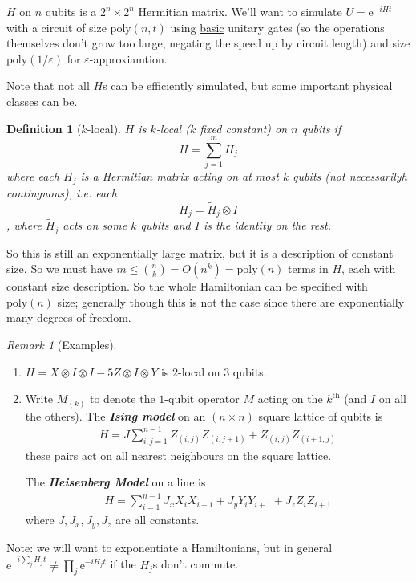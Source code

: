 \documentclass[]{article}
\theoremstyle{custhm}
\theoremstyle{cusdef}
\theoremstyle{custhm}
\theoremstyle{custhm}
\theoremstyle{custhm}
\theoremstyle{custhm}
\theoremstyle{cusdef}
\newtheorem*{defin*}{Definition}
\theoremstyle{remark}
\newtheorem*{remark*}{Remark}
\newcommand{\e}{\mathrm{e}}
\newcommand{\eps}{\varepsilon}
\newcommand{\undf}[1]{\textit{\textbf{#1}}}
\newcommand{\poly}{\textrm{poly}}
\begin{document}
$H$ on $n$ qubits is a $2^n\times 2^n$ Hermitian matrix. We'll want to simulate $U = \e^{-iHt}$ with a circuit of size $\poly(n,t)$ using \underline{basic} unitary gates (so the operations themselves don't grow too large, negating the speed up by circuit length) and size $\poly(1/\eps)$ for $\eps$-approxiamtion.

Note that not all $H$s can be efficiently simulated, but some important physical classes can be.

\begin{defin*}[$k$-local]
	$H$ is $k$-local ($k$ fixed constant) on $n$ qubits if $$H = \sum_{j=1}^{m} H_j$$ where each $H_j$ is a Hermitian matrix acting on at most $k$ qubits (not necessarilyh continguous), \textit{i.e.} each $$H_j = \tilde{H}_j \otimes I$$, where $\tilde{H}_j$ acts on some $k$ qubits and $I$ is the identity on the rest.
\end{defin*}

So this is still an exponentially large matrix, but it is a description of constant size. So we must have $m\le {n\choose k} = O(n^k) = \poly(n)$ terms in $H$, each with constant size description. So the whole Hamiltonian can be specified with $\poly(n)$ size; generally though this is not the case since there are exponentially many degrees of freedom.

\begin{remark*}[Examples]\ 
	\begin{enumerate}[label=\arabic*)]
		\item $H = X\otimes I\otimes I - 5Z\otimes I\otimes Y$ is $2$-local on $3$ qubits.
		\item Write $M_{(k)}$ to denote the $1$-qubit operator $M$ acting on the $k^{\textrm{th}}$ (and $I$ on all the others). The \undf{Ising model} on an $(n\times n)$ square lattice of qubits is
		\begin{align*}
			H = J\sum_{i,j=1}^{n-1}Z_{(i,j)}Z_{(i,j+1)} + Z_{(i,j)}Z_{(i+1,j)}
		\end{align*}
		these pairs act on all nearest neighbours on the square lattice.

		The \undf{Heisenberg Model} on a line is
		\begin{align*}
			H = \sum_{i=1}^{n-1}J_xX_iX_{i+1} + J_yY_iY_{i+1}+J_zZ_iZ_{i+1}
		\end{align*}
		where $J,J_x,J_y,J_z$ are all constants.
	\end{enumerate}
\end{remark*}

Note: we will want to exponentiate a Hamiltonians, but in general $\e^{-i\sum_j H_jt}\ne \prod_j \e^{-iH_jt}$ if the $H_j$s don't commute.
\end{document}
